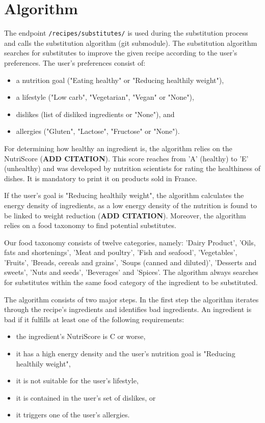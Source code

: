 \section{Algorithm} \label{algorithm}
The endpoint \texttt{/recipes/substitutes/} is used during the substitution process and calls the substitution algorithm (git submodule). The substitution algorithm searches for substitutes to improve the given recipe according to the user's preferences. The user's preferences consist of:
\vspace{-1em}
\begin{itemize}
	\itemsep-0.5em 
	\item a nutrition goal ("Eating healthy" or "Reducing healthily weight"),
	\item a lifestyle ("Low carb", "Vegetarian", "Vegan" or "None"),
	\item dislikes (list of disliked ingredients or "None"), and
	\item allergies ("Gluten", "Lactose", "Fructose" or "None").
\end{itemize} 
\vspace{1em}

For determining how healthy an ingredient is, the algorithm relies on the NutriScore (\textbf{ADD CITATION}). This score reaches from 'A' (healthy) to 'E' (unhealthy) and was developed by nutrition scientists for rating the healthiness of dishes. It is mandatory to print it on products sold in France. 

If the user's goal is "Reducing healthily weight", the algorithm calculates the energy density of ingredients, as a low energy density of the nutrition is found to be linked to weight reduction (\textbf{ADD CITATION}). Moreover, the algorithm relies on a food taxonomy to find potential substitutes. 

Our food taxonomy consists of twelve categories, namely: 'Dairy Product',  'Oils, fats and shortenings', 'Meat and poultry',    'Fish and seafood', 'Vegetables', 'Fruits', 'Breads, cereals and grains', 'Soups (canned and diluted)', 'Desserts and sweets', 'Nuts and seeds', 'Beverages' and 'Spices'. The algorithm always searches for substitutes within the same food category of the ingredient to be substituted.
\clearpage


The algorithm consists of two major steps. In the first step the algorithm iterates through the recipe's ingredients and identifies bad ingredients. An ingredient is bad if it fulfills at least one of the following requirements:
\begin{itemize}
	\itemsep-0.5em 
	\item the ingredient's NutriScore is C or worse,
	\item it has a high energy density and the user's nutrition goal is "Reducing healthily weight",
	\item it is not suitable for the user's lifestyle,
	\item it is contained in the user's set of dislikes, or
	\item it triggers one of the user's allergies.
\end{itemize}

